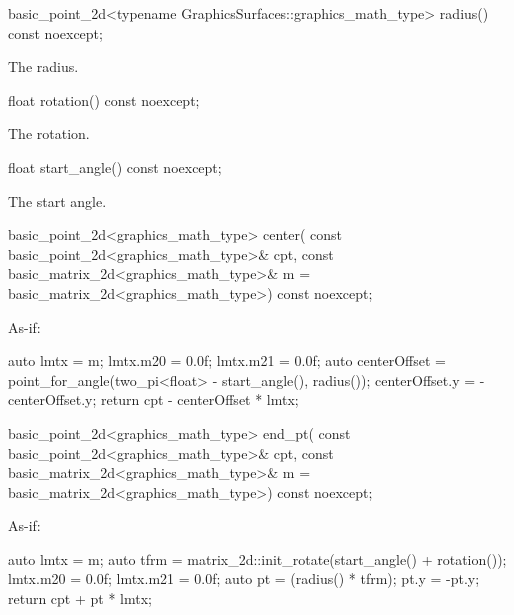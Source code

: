 %
\begin{itemdecl}
basic_point_2d<typename GraphicsSurfaces::graphics_math_type> radius() const noexcept;
\end{itemdecl}
\begin{itemdescr}
\pnum
\returns The radius.
\end{itemdescr}

%
\begin{itemdecl}
float rotation() const noexcept;
\end{itemdecl}
\begin{itemdescr}
\pnum
\returns The rotation.
\end{itemdescr}

%
\begin{itemdecl}
float start_angle() const noexcept;
\end{itemdecl}
\begin{itemdescr}
\pnum
\returns The start angle.
\end{itemdescr}

%
\begin{itemdecl}
basic_point_2d<graphics_math_type> center(
  const basic_point_2d<graphics_math_type>& cpt,
  const basic_matrix_2d<graphics_math_type>& m =
    basic_matrix_2d<graphics_math_type>{}) const noexcept;
\end{itemdecl}
\begin{itemdescr}
\pnum
\returns
As-if:
\begin{codeblock}
auto lmtx = m;
lmtx.m20 = 0.0f;
lmtx.m21 = 0.0f;
auto centerOffset = point_for_angle(two_pi<float> - start_angle(), radius());
centerOffset.y = -centerOffset.y;
return cpt - centerOffset * lmtx;
\end{codeblock}
\end{itemdescr}

%
\begin{itemdecl}
basic_point_2d<graphics_math_type> end_pt(
  const basic_point_2d<graphics_math_type>& cpt,
  const basic_matrix_2d<graphics_math_type>& m =
    basic_matrix_2d<graphics_math_type>{}) const noexcept;
\end{itemdecl}
\begin{itemdescr}
\pnum
\returns
As-if:
\begin{codeblock}
auto lmtx = m;
auto tfrm = matrix_2d::init_rotate(start_angle() + rotation());
lmtx.m20 = 0.0f;
lmtx.m21 = 0.0f;
auto pt = (radius() * tfrm);
pt.y = -pt.y;
return cpt + pt * lmtx;
\end{codeblock}
\end{itemdescr}


